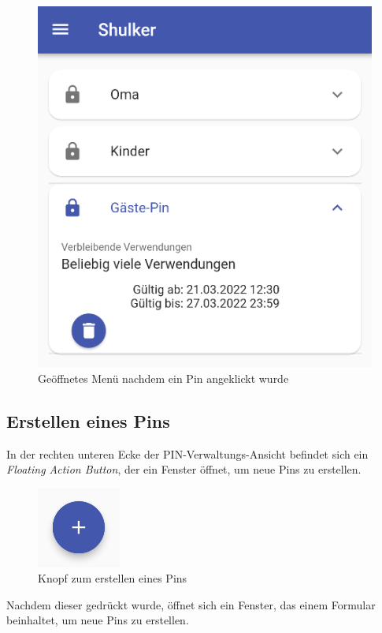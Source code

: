 \begin{figure}[H]
    \begin{center}
        \includegraphics[width=.6\textwidth]{images/mobile/ClickedPin.png}
        \caption{Geöffnetes Menü nachdem ein Pin angeklickt wurde}
    \end{center}
\end{figure}

\subsection{Erstellen eines Pins}
In der rechten unteren Ecke der PIN-Verwaltungs-Ansicht befindet sich ein \textit{Floating Action Button},
der ein Fenster öffnet, um neue Pins zu erstellen.

\begin{figure}[H]
    \begin{center}
        \includegraphics[width=.1\textwidth]{images/mobile/CreatePinButton.png}
        \caption{Knopf zum erstellen eines Pins}
    \end{center}
\end{figure}

Nachdem dieser gedrückt wurde, öffnet sich ein Fenster, das einem Formular beinhaltet, um neue Pins zu erstellen.

